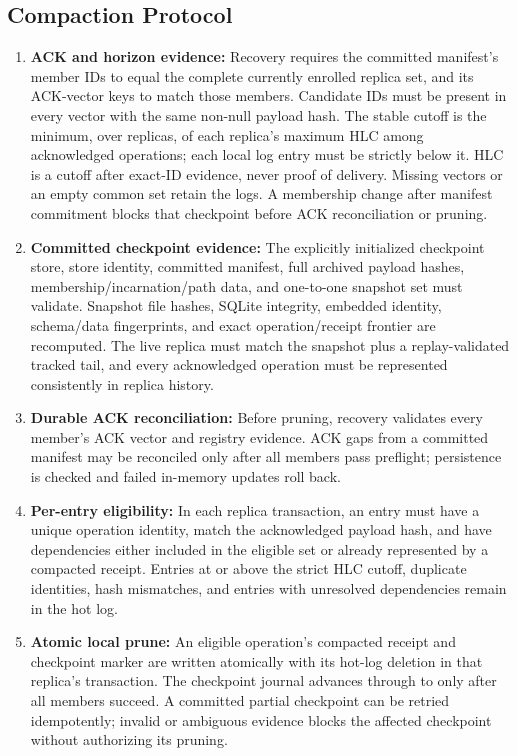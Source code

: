 \documentclass[runningheads]{llncs}
\begin{document}
\subsection{Compaction Protocol}
\begin{enumerate}
\item \textbf{ACK and horizon evidence:} Recovery requires the committed manifest's member IDs to equal the complete currently enrolled replica set, and its ACK-vector keys to match those members. Candidate IDs must be present in every vector with the same non-null payload hash. The stable cutoff is the minimum, over replicas, of each replica's maximum HLC among acknowledged operations; each local log entry must be strictly below it. HLC is a cutoff after exact-ID evidence, never proof of delivery. Missing vectors or an empty common set retain the logs. A membership change after manifest commitment blocks that checkpoint before ACK reconciliation or pruning.
\item \textbf{Committed checkpoint evidence:} The explicitly initialized checkpoint store, store identity, committed manifest, full archived payload hashes, membership/incarnation/path data, and one-to-one snapshot set must validate. Snapshot file hashes, SQLite integrity, embedded identity, schema/data fingerprints, and exact operation/receipt frontier are recomputed. The live replica must match the snapshot plus a replay-validated tracked tail, and every acknowledged operation must be represented consistently in replica history.
\item \textbf{Durable ACK reconciliation:} Before pruning, recovery validates every member's ACK vector and registry evidence. ACK gaps from a committed manifest may be reconciled only after all members pass preflight; persistence is checked and failed in-memory updates roll back.
\item \textbf{Per-entry eligibility:} In each replica transaction, an entry must have a unique operation identity, match the acknowledged payload hash, and have dependencies either included in the eligible set or already represented by a compacted receipt. Entries at or above the strict HLC cutoff, duplicate identities, hash mismatches, and entries with unresolved dependencies remain in the hot log.
\item \textbf{Atomic local prune:} An eligible operation's compacted receipt and checkpoint marker are written atomically with its hot-log deletion in that replica's \texttt{} transaction. The checkpoint journal advances through \texttt{} to \texttt{} only after all members succeed. A committed partial checkpoint can be retried idempotently; invalid or ambiguous evidence blocks the affected checkpoint without authorizing its pruning.

\end{enumerate}
\end{document}
